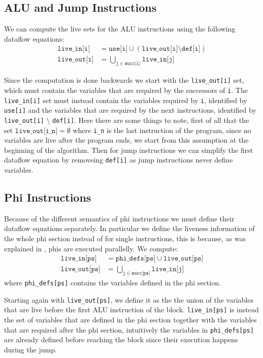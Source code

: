 \subsection{ALU and Jump Instructions}

We can compute the live sets for the ALU instructions using the following dataflow equations:
\begin{align*}
  \texttt{live\_in[i]} &= \texttt{use[i]} \cup (\texttt{live\_out[i]} \setminus \texttt{def[i]}) \\
  \texttt{live\_out[i]} &= \bigcup \limits_{\texttt j \in \texttt{succ[i]}} \texttt{live\_in[j]}
\end{align*}

Since the computation is done backwards we start with the \texttt{live\_out[i]} set, which must contain the variables that are required by the successors of \texttt i. The
\texttt{live\_in[i]} set must instead contain the variables required by \texttt i, identified by \texttt{use[i]} and the variables that are required by the next instructions, identified by \texttt{live\_out[i]} $\setminus$ \texttt{def[i]}.
Here there are some things to note, first of all that the set $\texttt{live\_out[i\_n]} = \emptyset$ where \texttt{i\_n} is the last instruction of the program, since no variables are live after the program ends, we start from this assumption at the beginning of the algorithm.
Then for jump instructions we can simplify the first dataflow equation by removeing \texttt{def[i]} as jump instructions never define variables.

\subsection{Phi Instructions}

Because of the different semantics of phi instructions we must define their dataflow equations separately. In particular we define the liveness information of the whole phi section instead of for single instructions, this is because, as was explained in , phis are executed parallelly.
We compute:
\begin{align*}
  \texttt{live\_in[ps]} &= \texttt{phi\_defs[ps]} \cup \texttt{live\_out[ps]} \\
  \texttt{live\_out[ps]} &= \bigcup \limits_{\texttt j \in \texttt{succ[ps]}} \texttt{live\_in[j]}
\end{align*}
where \texttt{phi\_defs[ps]} contains the variables defined in the phi section.

Starting again with \texttt{live\_out[ps]}, we define it as the the union of the variables that are live before the first ALU instruction of the block. \texttt{live\_in[ps]} is instead the set of variables that are defined in the phi section together with the variables that are required after the phi section, intuitively the variables in \texttt{phi\_defs[ps]} are already defined before reaching the block since their execution happens during the jump.

